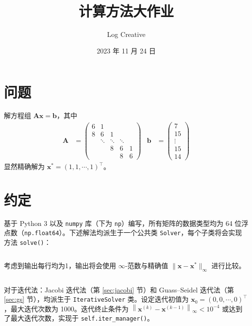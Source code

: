 \documentclass{sjtuarticle}
\title{计算方法大作业}
\author{Log Creative}
\date{2023 年 11 月 24 日}
\begin{document}
\maketitle
\tableofcontents
\section{问题}
解方程组 $\bm{A}\bm{x}=\bm{b}$，其中
\begin{align*}
    \bm{A}&=\begin{pmatrix}
        6 & 1 \\
        8 & 6 & 1 \\
          & \ddots & \ddots & \ddots \\
          &        & 8 & 6 & 1 \\
          &        &   & 8 & 6
    \end{pmatrix} & \bm{b}&=\begin{pmatrix}
        7 \\ 15 \\ \vdots \\ 15 \\ 14
    \end{pmatrix}
\end{align*}
显然精确解为 $\bm{x}^*=(1,1,\cdots, 1)^\top$。

\section{约定}

基于 Python 3 以及 \verb"numpy" 库（下为 \verb"np"）编写，所有矩阵的数据类型均为 64 位浮点数（\verb"np.float64"）。下述解法均派生于一个公共类 \verb"Solver"，每个子类将会实现方法 \verb"solve()"：

\inputminted[firstline=4,lastline=21,fontsize=\scriptsize]{python3}{main.py}

考虑到输出每行均为1，输出将会使用 $\infty$-范数与精确值 $\lVert \bm{x}-\bm{x}^* \rVert_\infty$ 进行比较。

\inputminted[firstline=214,lastline=224,fontsize=\scriptsize]{python3}{main.py}

对于迭代法：Jacobi 迭代法（第 \ref{sec:jacobi} 节）和 Guass--Seidel 迭代法（第 \ref{sec:gs} 节），均派生于 \verb"IterativeSolver" 类。设定迭代初值为 $\bm{x}_0=(0,0,\cdots,0)^\top$，最大迭代次数为 1000。迭代终止条件为 $\left\lVert \bm{x}^{(k)}-\bm{x}^{(k-1)}\right\rVert_\infty < 10^{-4}$ 或达到了最大迭代次数，实现于 \verb"self.iter_manager()"。

\inputminted[firstline=137,lastline=155,fontsize=\scriptsize]{python3}{main.py}
\end{document}
